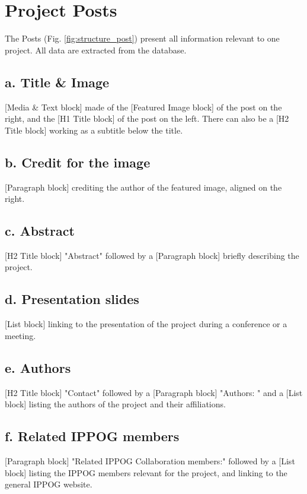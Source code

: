 \section{Project Posts}\label{sec:structure_post}

The Posts (Fig. \ref{fig:structure_post}) present all information relevant to one project. All data are extracted from the database.

\subsection*{a. Title \& Image}
[Media \& Text block] made of the [Featured Image block] of the post on the right, and the [H1 Title block] of the post on the left. There can also be a [H2 Title block] working as a subtitle below the title.

\subsection*{b. Credit for the image}
[Paragraph block] crediting the author of the featured image, aligned on the right.

\subsection*{c. Abstract}
[H2 Title block] "Abstract" followed by a [Paragraph block] briefly describing the project.

\subsection*{d. Presentation slides}
[List block] linking to the presentation of the project during a conference or a meeting.

\subsection*{e. Authors}
[H2 Title block] "Contact" followed by a [Paragraph block] "Authors: " and a [List block] listing the authors of the project and their affiliations.

\subsection*{f. Related IPPOG members}
[Paragraph block] "Related IPPOG Collaboration members:" followed by a [List block] listing the IPPOG members relevant for the project, and linking to the general IPPOG website.

